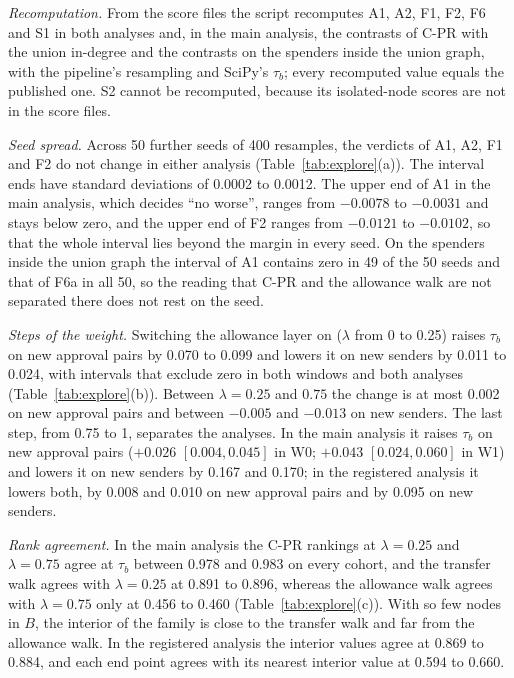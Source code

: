 \documentclass{ieeeaccess}
\newcommand{\cpr}{\mbox{C-PR}}
\begin{document}


\emph{Recomputation.} From the score files the script recomputes A1, A2, F1, F2, F6 and S1 in both analyses and, in the main analysis, the contrasts of \cpr{} with the union in-degree and the contrasts on the spenders inside the union graph, with the pipeline's resampling and SciPy's $\tau_b$; every recomputed value equals the published one. S2 cannot be recomputed, because its isolated-node scores are not in the score files.

\emph{Seed spread.} Across 50 further seeds of 400 resamples, the verdicts of A1, A2, F1 and F2 do not change in either analysis (Table~\ref{tab:explore}(a)). The interval ends have standard deviations of 0.0002 to 0.0012. The upper end of A1 in the main analysis, which decides ``no worse'', ranges from $-0.0078$ to $-0.0031$ and stays below zero, and the upper end of F2 ranges from $-0.0121$ to $-0.0102$, so that the whole interval lies beyond the margin in every seed. On the spenders inside the union graph the interval of A1 contains zero in 49 of the 50 seeds and that of F6a in all 50, so the reading that \cpr{} and the allowance walk are not separated there does not rest on the seed.

\emph{Steps of the weight.} Switching the allowance layer on ($\lambda$ from 0 to 0.25) raises $\tau_b$ on new approval pairs by 0.070 to 0.099 and lowers it on new senders by 0.011 to 0.024, with intervals that exclude zero in both windows and both analyses (Table~\ref{tab:explore}(b)). Between $\lambda=0.25$ and $0.75$ the change is at most 0.002 on new approval pairs and between $-0.005$ and $-0.013$ on new senders. The last step, from 0.75 to 1, separates the analyses. In the main analysis it raises $\tau_b$ on new approval pairs ($+0.026$ $[0.004,0.045]$ in W0; $+0.043$ $[0.024,0.060]$ in W1) and lowers it on new senders by 0.167 and 0.170; in the registered analysis it lowers both, by 0.008 and 0.010 on new approval pairs and by 0.095 on new senders.

\emph{Rank agreement.} In the main analysis the \cpr{} rankings at $\lambda=0.25$ and $\lambda=0.75$ agree at $\tau_b$ between 0.978 and 0.983 on every cohort, and the transfer walk agrees with $\lambda=0.25$ at 0.891 to 0.896, whereas the allowance walk agrees with $\lambda=0.75$ only at 0.456 to 0.460 (Table~\ref{tab:explore}(c)). With so few nodes in $B$, the interior of the family is close to the transfer walk and far from the allowance walk. In the registered analysis the interior values agree at 0.869 to 0.884, and each end point agrees with its nearest interior value at 0.594 to 0.660.
\end{document}
